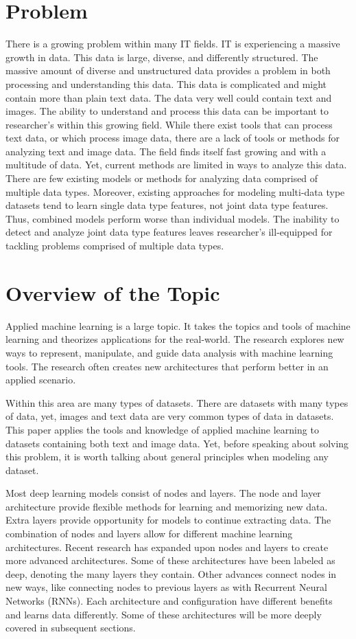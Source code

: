 
\chapter{Problem}
There is a growing problem within many IT fields.  IT is experiencing a massive growth in data.  This data is large, diverse, and differently structured.  The massive amount of diverse and unstructured data provides a problem in both processing and understanding this data.  This data is complicated and might contain more than plain text data.  The data very well could contain text and images.  The ability to understand and process this data can be important to researcher's within this growing field.  While there exist tools that can process text data, or which process image data, there are a lack of tools or methods for analyzing text and image data.  The field finds itself fast growing and with a multitude of data.  Yet, current methods are limited in ways to analyze this data.  There are few existing models or methods for analyzing data comprised of multiple data types.  Moreover, existing approaches for modeling multi-data type datasets tend to learn single data type features, not joint data type features.  Thus, combined models perform worse than individual models.  The inability to detect and analyze joint data type features leaves researcher's ill-equipped for tackling problems comprised of multiple data types.


\chapter{Overview of the Topic}
Applied machine learning is a large topic.  It takes the topics and tools of machine learning and theorizes applications for the real-world.  The research explores new ways to represent, manipulate, and guide data analysis with machine learning tools.  The research often creates new architectures that perform better in an applied scenario.

Within this area are many types of datasets.  There are datasets with many types of data, yet, images and text data are very common types of data in datasets.  This paper applies the tools and knowledge of applied machine learning to datasets containing both text and image data.  Yet, before speaking about solving this problem, it is worth talking about general principles when modeling any dataset.  

Most deep learning models consist of nodes and layers.  The node and layer architecture provide flexible methods for learning and memorizing new data.  Extra layers provide opportunity for models to continue extracting data.  The combination of nodes and layers allow for different machine learning architectures.  Recent research has expanded upon nodes and layers to create more advanced architectures.  Some of these architectures have been labeled as deep, denoting the many layers they contain. Other advances connect nodes in new ways, like connecting nodes to previous layers as with Recurrent Neural Networks (RNNs).  Each architecture and configuration have different benefits and learns data differently.  Some of these architectures will be more deeply covered in subsequent sections.  

